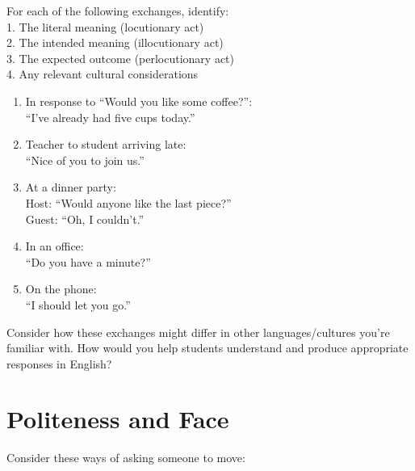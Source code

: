 \begin{tcolorbox}[title=Practice: Analyzing Speech Acts, colback=white, parbox]
\setlength{\parindent}{1.5em}
\noindent For each of the following exchanges, identify:\\
\phantom{~~~}1. The literal meaning (locutionary act)\\
\phantom{~~~}2. The intended meaning (illocutionary act)\\
\phantom{~~~}3. The expected outcome (perlocutionary act)\\
\phantom{~~~}4. Any relevant cultural considerations
\begin{enumerate}[noitemsep]
    \item In response to ``Would you like some coffee?'':\\
    ``I've already had five cups today.''
    
    \item Teacher to student arriving late:\\
    ``Nice of you to join us.''
    
    \item At a dinner party:\\
    Host: ``Would anyone like the last piece?''\\
    Guest: ``Oh, I couldn't.''
    
    \item In an office:\\
    ``Do you have a minute?''
    
    \item On the phone:\\
    ``I should let you go.''
\end{enumerate}

Consider how these exchanges might differ in other languages/cultures you're familiar with. How would you help students understand and produce appropriate responses in English?
\end{tcolorbox}

\section{Politeness and Face}\label{sec:politeness}

Consider these ways of asking someone to move:
\ea
    \z
\z

